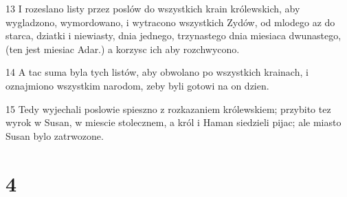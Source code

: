 \par 13 I rozeslano listy przez poslów do wszystkich krain królewskich, aby wygladzono, wymordowano, i wytracono wszystkich Zydów, od mlodego az do starca, dziatki i niewiasty, dnia jednego, trzynastego dnia miesiaca dwunastego, (ten jest miesiac Adar.) a korzysc ich aby rozchwycono.
\par 14 A tac suma byla tych listów, aby obwolano po wszystkich krainach, i oznajmiono wszystkim narodom, zeby byli gotowi na on dzien.
\par 15 Tedy wyjechali poslowie spieszno z rozkazaniem królewskiem; przybito tez wyrok w Susan, w miescie stolecznem, a król i Haman siedzieli pijac; ale miasto Susan bylo zatrwozone.

\chapter{4}

